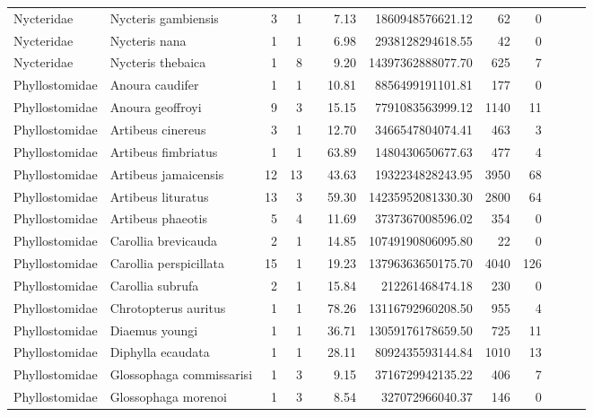 \begin{landscape}
\begin{longtable}{@{}llrrrrrrrrrr@{}}
  Nycteridae & Nycteris gambiensis &   3 &   1 &  & 7.13 & 1860948576621.12 &  62 &   0 &  &  &  \\ 
  Nycteridae & Nycteris nana &   1 &   1 &  & 6.98 & 2938128294618.55 &  42 &   0 &  &  &  \\ 
  Nycteridae & Nycteris thebaica &   1 &   8 &  & 9.20 & 14397362888077.70 & 625 &   7 &  &  &  \\ 
  Phyllostomidae & Anoura caudifer &   1 &   1 &  & 10.81 & 8856499191101.81 & 177 &   0 &  &  &  \\ 
  Phyllostomidae & Anoura geoffroyi &   9 &   3 &  & 15.15 & 7791083563999.12 & 1140 &  11 &  &  &  \\ 
  Phyllostomidae & Artibeus cinereus &   3 &   1 &  & 12.70 & 3466547804074.41 & 463 &   3 &  &  &  \\ 
  Phyllostomidae & Artibeus fimbriatus &   1 &   1 &  & 63.89 & 1480430650677.63 & 477 &   4 &  &  &  \\ 
  Phyllostomidae & Artibeus jamaicensis &  12 &  13 &  & 43.63 & 1932234828243.95 & 3950 &  68 &  &  &  \\ 
  Phyllostomidae & Artibeus lituratus &  13 &   3 &  & 59.30 & 14235952081330.30 & 2800 &  64 &  &  &  \\ 
  Phyllostomidae & Artibeus phaeotis &   5 &   4 &  & 11.69 & 3737367008596.02 & 354 &   0 &  &  &  \\ 
  Phyllostomidae & Carollia brevicauda &   2 &   1 &  & 14.85 & 10749190806095.80 &  22 &   0 &  &  &  \\ 
  Phyllostomidae & Carollia perspicillata &  15 &   1 &  & 19.23 & 13796363650175.70 & 4040 & 126 &  &  &  \\ 
  Phyllostomidae & Carollia subrufa &   2 &   1 &  & 15.84 & 212261468474.18 & 230 &   0 &  &  &  \\ 
  Phyllostomidae & Chrotopterus auritus &   1 &   1 &  & 78.26 & 13116792960208.50 & 955 &   4 &  &  &  \\ 
  Phyllostomidae & Diaemus youngi &   1 &   1 &  & 36.71 & 13059176178659.50 & 725 &  11 &  &  &  \\ 
  Phyllostomidae & Diphylla ecaudata &   1 &   1 &  & 28.11 & 8092435593144.84 & 1010 &  13 &  &  &  \\ 
  Phyllostomidae & Glossophaga commissarisi &   1 &   3 &  & 9.15 & 3716729942135.22 & 406 &   7 &  &  &  \\ 
  Phyllostomidae & Glossophaga morenoi &   1 &   3 &  & 8.54 & 327072966040.37 & 146 &   0 &  &  &  \\ 

\end{longtable}
\end{landscape}
